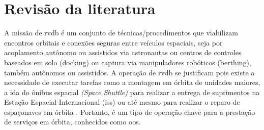 \section{Revisão da literatura}


A missão de \gls{rvdb} é um conjunto de técnicas/procedimentos que viabilizam encontros orbitais e conexões seguras entre veículos espaciais, seja por acoplamento autônomo ou assistidos via astronautas ou centros de controles baseados em solo (docking) ou captura via manipuladores robóticos (berthing), também autônomos ou assistidos.
A operação de \gls{rvdb} se justificam pois existe a necessidade de executar tarefas como a montagem em órbita de unidades maiores, a ida do ônibus espacial \emph{(Space Shuttle)} para realizar a entrega de suprimentos na Estação Espacial Internacional (\gls{iss}) ou até mesmo para realizar o reparo de espaçonaves em órbita \cite{fehse2003}.
Portanto, é um tipo de operação chave para a prestação de serviços em órbita, conhecidos como \gls{oos}.




